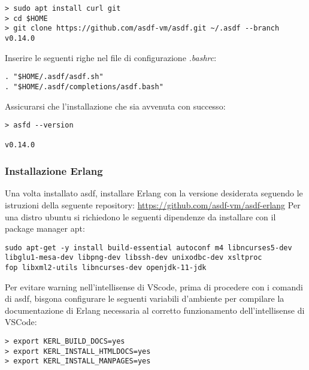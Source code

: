 \begin{lstlisting}[language=none]
> sudo apt install curl git
> cd $HOME
> git clone https://github.com/asdf-vm/asdf.git ~/.asdf --branch v0.14.0
\end{lstlisting}

Inserire le seguenti righe nel file di configurazione \textit{.bashrc}:

\begin{lstlisting}[language=none]
. "$HOME/.asdf/asdf.sh"
. "$HOME/.asdf/completions/asdf.bash"
\end{lstlisting}

Assicurarsi che l'installazione che sia avvenuta con successo:

\begin{lstlisting}[language=none]
> asfd --version

v0.14.0
\end{lstlisting}

\subsubsection{Installazione Erlang}

Una volta installato asdf, installare Erlang con la versione desiderata
seguendo le istruzioni della seguente repository: \url{https://github.com/asdf-vm/asdf-erlang}
Per una distro ubuntu si richiedono le seguenti dipendenze da installare con
il package manager apt:
\begin{lstlisting}[language=none]
sudo apt-get -y install build-essential autoconf m4 libncurses5-dev
libglu1-mesa-dev libpng-dev libssh-dev unixodbc-dev xsltproc
fop libxml2-utils libncurses-dev openjdk-11-jdk
\end{lstlisting}

Per evitare warning nell'intellisense di VScode, prima di procedere con i
comandi di asdf, bisgona configurare
le seguenti variabili d'ambiente per compilare la documentazione di Erlang
necessaria al corretto funzionamento dell'intellisense di VSCode:

\begin{lstlisting}[language=none]
> export KERL_BUILD_DOCS=yes
> export KERL_INSTALL_HTMLDOCS=yes
> export KERL_INSTALL_MANPAGES=yes
\end{lstlisting}

